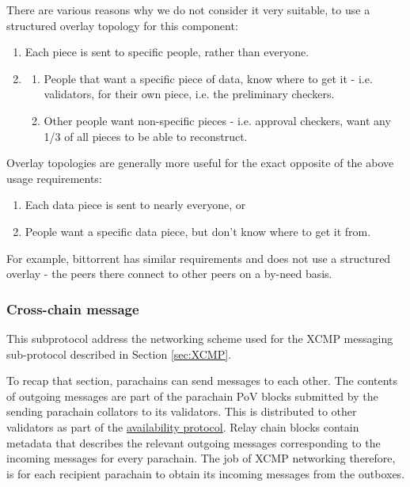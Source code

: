 \documentclass{article}
\begin{document}
There are various reasons why we do not consider it very suitable, to use a
structured overlay topology for this component:

\begin{enumerate}
	\item Each piece is sent to specific people, rather than everyone.
	\item
	\begin{enumerate}
		\item People that want a specific piece of data, know where to get it - i.e.
		validators, for their own piece, i.e. the preliminary checkers.
		\item Other people want non-specific pieces - i.e. approval checkers,
		want any 1/3 of all pieces to be able to reconstruct.
	\end{enumerate}
\end{enumerate}

Overlay topologies are generally more useful for the exact opposite of the
above usage requirements:

\begin{enumerate}
	\item Each data piece is sent to nearly everyone, or
	\item People want a specific data piece, but don't know where to get it from.
\end{enumerate}

For example, bittorrent has similar requirements and does not use a structured
overlay - the peers there connect to other peers on a by-need basis.

\subsubsection{Cross-chain message} \label{sec:net_crosschain}

This subprotocol address the networking scheme used for the XCMP messaging sub-protocol described in Section \ref{sec:XCMP}.

To recap that section, parachains can send messages to each other. The contents
of outgoing messages are part of the parachain PoV blocks submitted by the
sending parachain collators to its validators. This is distributed to other
validators as part of the \hyperref[sec:net_storage]{availability protocol}.
Relay chain blocks contain metadata that describes the relevant outgoing
messages corresponding to the incoming messages for every parachain. The job of
XCMP networking therefore, is for each recipient parachain to obtain its
incoming messages from the outboxes.
\end{document}
